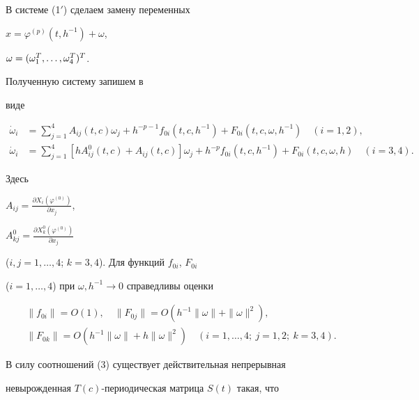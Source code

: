 \begin{pf} 


В системе (1${}'$) сделаем замену переменных 


$x=\varphi^{(p)}(t,h^{-1})+\omega$, 


$\omega=\linebreak (\omega^T_1,\dotsc,\omega^T_4)^T$.


Полученную систему запишем в 


виде 


\begin{equation} 


\begin{split} 


\Dot\omega_i &=\sum^4_{j=1}A_{ij}(t,c)\omega_j+h^{-p-1} 


f_{0i}(t,c,h^{-1})+F_{0i}(t,c,\omega,h^{-1})\quad (i=1,2), \\ 


\Dot\omega_i &=\sum^4_{j=1}[h A^0_{ij}(t,c)+A_{ij}(t,c)] 


\omega_j+h^{-p}f_{0i}(t,c,h^{-1})+F_{0i}(t,c,\omega,h) 


\quad (i=3,4). 


\end{split} 


\end{equation} 


Здесь 


$A_{ij}=\frac{\partial X_i(\varphi^{(0)})}{\partial x_j}$, 


$A^0_{kj}=\frac{\partial X^0_k(\varphi^{(0)})}{\partial x_j}$ 


($i,j=1,\dotsc,4$; $k=3,4$). Для функций $f_{0i}$, $F_{0i}$ 


($i=1,\dotsc,4$) при $\omega,h^{-1}\to 0$ справедливы оценки 


\begin{gather*} 


\|f_{0i}\|=O(1),\quad \|F_{0j}\|=O(h^{-1}\|\omega\|+\|\omega\|^2), \\ 


\|F_{0k}\|=O(h^{-1}\|\omega\|+h\|\omega\|^2)\quad 


(i=1,\dotsc,4; \ j=1,2; \ k=3,4). 


\end{gather*} 


В силу соотношений (3) существует действительная непрерывная 


невырожденная $T(c)$-пе\-ри\-о\-ди\-чес\-кая матрица $S(t)$ такая, что 



\end{pf}
